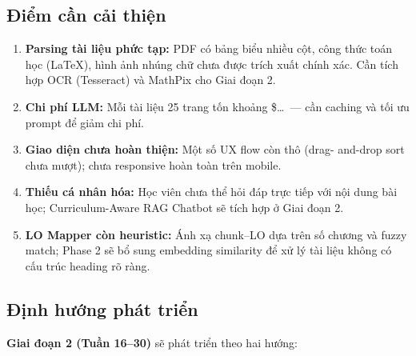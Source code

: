 \subsection{Điểm cần cải thiện}

\begin{enumerate}
    \item \textbf{Parsing tài liệu phức tạp:} PDF có bảng biểu nhiều cột,
          công thức toán học (LaTeX), hình ảnh nhúng chữ chưa được trích xuất
          chính xác. Cần tích hợp OCR (Tesseract) và MathPix cho Giai đoạn 2.
    \item \textbf{Chi phí LLM:} Mỗi tài liệu 25 trang tốn khoảng
          \$\ldots\ --- cần caching và tối ưu prompt để giảm chi phí.
    \item \textbf{Giao diện chưa hoàn thiện:} Một số UX flow còn thô (drag-
          and-drop sort chưa mượt); chưa responsive hoàn toàn trên mobile.
    \item \textbf{Thiếu cá nhân hóa:} Học viên chưa thể hỏi đáp trực tiếp
          với nội dung bài học; Curriculum-Aware RAG Chatbot sẽ tích hợp ở
          Giai đoạn 2.
    \item \textbf{LO Mapper còn heuristic:} Ánh xạ chunk--LO dựa trên số
          chương và fuzzy match; Phase 2 sẽ bổ sung embedding similarity
          để xử lý tài liệu không có cấu trúc heading rõ ràng.
\end{enumerate}

\subsection{Định hướng phát triển}

\textbf{Giai đoạn 2 (Tuần 16--30)} sẽ phát triển theo hai hướng:

